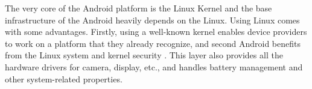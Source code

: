 The very core of the Android platform is the Linux Kernel and the base infrastructure of the Android heavily depends on the Linux. Using Linux comes with some advantages. Firstly, using a well-known kernel enables device providers to work on a platform that they already recognize, and second Android benefits from the Linux system and kernel security \cite{7}. This layer also provides all the hardware drivers for camera, display, etc., and handles battery management and other system-related properties.